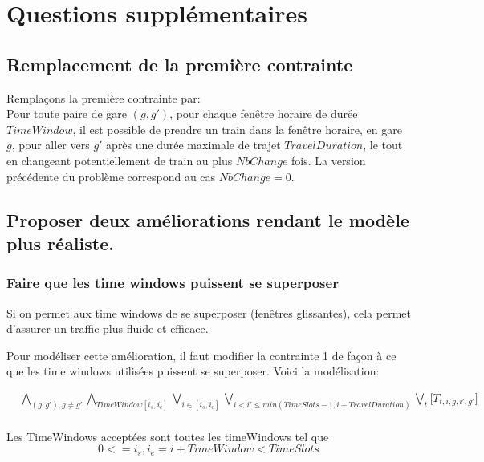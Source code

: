 \documentclass[a4paper]{article}
\begin{document}
\section{Questions supplémentaires}

\subsection{Remplacement de la première contrainte}

Remplaçons la première contrainte par: \\

Pour toute paire de gare $(g, g')$, pour chaque fenêtre horaire de durée $TimeWindow$,
il est possible de prendre un train dans la fenêtre horaire, en gare $g$, pour aller vers $g'$
après une durée maximale de trajet $TravelDuration$, le tout en changeant potentiellement de train au plus $NbChange$ fois. La version précédente du problème correspond
au cas $NbChange=0$.

\subsection{Proposer deux améliorations rendant le modèle plus réaliste.}

\subsubsection{Faire que les time windows puissent se superposer}

Si on permet aux time windows de se superposer (fenêtres glissantes), cela permet d'assurer un traffic plus fluide et efficace.

Pour modéliser cette amélioration, il faut modifier la contrainte 1 de façon à ce que les time windows utilisées puissent se superposer. Voici la modélisation:

   \begin{equation*}
    \begin{split}
      & 
      \bigwedge_{(g,g'), g \neq g'} 
      \bigwedge_{TimeWindow [i_s,i_e]}
      \bigvee_{i \in [i_s,i_e]}
      \bigvee_{i < i' \leq min(TimeSlots - 1, i + TravelDuration)}
      \bigvee_{t}
      \big[T_{t,i,g,i', g'}] \\
    \end{split}
    \end{equation*}
    
Les TimeWindows acceptées sont toutes les timeWindows tel que 
$$0 <= i_s, i_e = i + TimeWindow < TimeSlots$$
\end{document}
